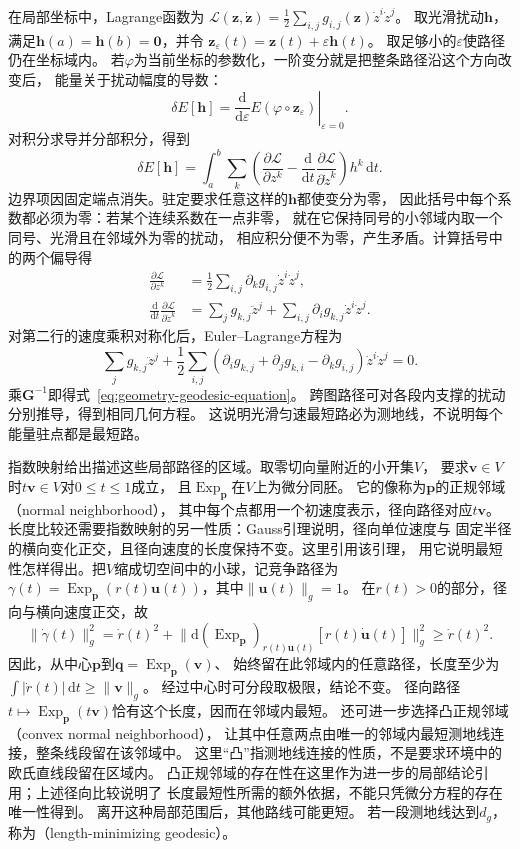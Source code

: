 在局部坐标中，Lagrange函数为
$\mathscr L(\bm z,\dot{\bm z})=\frac12\sum_{i,j}g_{i,j}(\bm z)\dot z^i\dot z^j$。
取光滑扰动$\bm h$，满足$\bm h(a)=\bm h(b)=\bm0$，并令
$\bm z_\varepsilon(t)=\bm z(t)+\varepsilon\bm h(t)$。
取足够小的$\varepsilon$使路径仍在坐标域内。
若$\varphi$为当前坐标的参数化，一阶变分就是把整条路径沿这个方向改变后，
能量关于扰动幅度的导数：
\[
 \delta E[\bm h]
 =\left.\frac{\mathrm d}{\mathrm d\varepsilon}
 E(\varphi\circ\bm z_\varepsilon)\right|_{\varepsilon=0}.
\]
对积分求导并分部积分，得到
\[
 \delta E[\bm h]
 =\int_a^b\sum_k\left(
 \frac{\partial\mathscr L}{\partial z^k}
 -\frac{\mathrm d}{\mathrm dt}
     \frac{\partial\mathscr L}{\partial\dot z^k}\right)h^k\,\mathrm dt.
\]
边界项因固定端点消失。驻定要求任意这样的$\bm h$都使变分为零，
因此括号中每个系数都必须为零：若某个连续系数在一点非零，
就在它保持同号的小邻域内取一个同号、光滑且在邻域外为零的扰动，
相应积分便不为零，产生矛盾。计算括号中的两个偏导得
\[
 \begin{aligned}
 \frac{\partial\mathscr L}{\partial z^k}
   &=\frac12\sum_{i,j}\partial_k g_{i,j}\dot z^i\dot z^j,\\
 \frac{\mathrm d}{\mathrm dt}
    \frac{\partial\mathscr L}{\partial\dot z^k}
   &=\sum_j g_{k,j}\ddot z^j+
     \sum_{i,j}\partial_i g_{k,j}\dot z^i\dot z^j.
 \end{aligned}
\]
对第二行的速度乘积对称化后，Euler--Lagrange方程为
\[
 \sum_jg_{k,j}\ddot z^j+
 \frac12\sum_{i,j}
  (\partial_i g_{k,j}+\partial_j g_{k,i}-\partial_k g_{i,j})
  \dot z^i\dot z^j=0.
\]
乘$\bm G^{-1}$即得式~\eqref{eq:geometry-geodesic-equation}。
跨图路径可对各段内支撑的扰动分别推导，得到相同几何方程。
这说明光滑匀速最短路必为测地线，不说明每个能量驻点都是最短路。

指数映射给出描述这些局部路径的区域。取零切向量附近的小开集$V$，
要求$\bm v\in V$时$t\bm v\in V$对$0\leq t\leq1$成立，
且$\operatorname{Exp}_{\bm p}$在$V$上为微分同胚。
它的像称为$\bm p$的正规邻域（normal neighborhood），
其中每个点都用一个初速度表示，径向路径对应$t\bm v$。
长度比较还需要指数映射的另一性质：Gauss引理说明，径向单位速度与
固定半径的横向变化正交，且径向速度的长度保持不变。这里引用该引理，
用它说明最短性怎样得出。把$V$缩成切空间中的小球，记竞争路径为
$\gamma(t)=\operatorname{Exp}_{\bm p}(r(t)\bm u(t))$，其中$\lVert\bm u(t)\rVert_g=1$。
在$r(t)>0$的部分，径向与横向速度正交，故
\[
 \lVert\dot\gamma(t)\rVert_g^2
 =\dot r(t)^2+
 \bigl\lVert\mathrm d(\operatorname{Exp}_{\bm p})_{r(t)\bm u(t)}
              [r(t)\dot{\bm u}(t)]\bigr\rVert_g^2
 \geq\dot r(t)^2.
\]
因此，从中心$\bm p$到$\bm q=\operatorname{Exp}_{\bm p}(\bm v)$、
始终留在此邻域内的任意路径，长度至少为
$\int|\dot r(t)|\,\mathrm dt\geq\lVert\bm v\rVert_g$。
经过中心时可分段取极限，结论不变。
径向路径$t\mapsto\operatorname{Exp}_{\bm p}(t\bm v)$恰有这个长度，因而在邻域内最短。
还可进一步选择凸正规邻域（convex normal neighborhood），
让其中任意两点由唯一的邻域内最短测地线连接，整条线段留在该邻域中。
这里“凸”指测地线连接的性质，不是要求环境中的欧氏直线段留在区域内。
凸正规邻域的存在性在这里作为进一步的局部结论引用；上述径向比较说明了
长度最短性所需的额外依据，不能只凭微分方程的存在唯一性得到。
离开这种局部范围后，其他路线可能更短。
若一段测地线达到$d_g$，称为（length-minimizing geodesic）。

